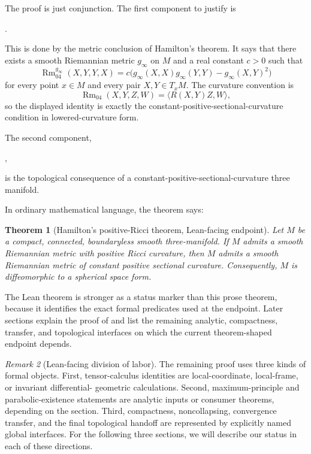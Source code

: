 \documentclass[11pt]{article}
\theoremstyle{plain}
\newtheorem{theorem}{Theorem}[section]
\theoremstyle{definition}
\theoremstyle{remark}
\newtheorem{remark}[theorem]{Remark}
\begin{document}
The proof is just conjunction.  The first component to justify is
\begin{center}
\texttt{}.
\end{center}
This is done by the metric conclusion of Hamilton's theorem.  It says that there exists a
smooth Riemannian metric \(g_\infty\) on \(M\) and a real constant \(c>0\)
such that
\[
  \operatorname{Rm}_{04}^{g_\infty}(X,Y,Y,X)
  =
  c\bigl(
    g_\infty(X,X)g_\infty(Y,Y)
    -
    g_\infty(X,Y)^2
  \bigr)
\]
for every point \(x\in M\) and every pair \(X,Y\in T_xM\).  The curvature
convention is
\[
  \operatorname{Rm}_{04}(X,Y,Z,W)=\langle R(X,Y)Z,W\rangle,
\]
so the displayed identity is exactly the constant-positive-sectional-curvature
condition in lowered-curvature form.

The second component,
\begin{center}
\texttt{},
\end{center}
is the topological consequence of a constant-positive-sectional-curvature three manifold.

In ordinary mathematical language, the theorem says:

\begin{theorem}[Hamilton's positive-Ricci theorem, Lean-facing endpoint]
\label{thm:main-hamilton-3d-lean-facing}
Let \(M\) be a compact, connected, boundaryless smooth three-manifold.  If
\(M\) admits a smooth Riemannian metric with positive Ricci curvature, then
\(M\) admits a smooth Riemannian metric of constant positive sectional
curvature.  Consequently, \(M\) is diffeomorphic to a spherical space form.
\end{theorem}

The Lean theorem is stronger as a status marker than this prose theorem,
because it identifies the exact formal predicates used at the endpoint.  Later
sections explain the proof of \texttt{} and list
the remaining analytic, compactness, transfer, and topological interfaces on
which the current theorem-shaped endpoint depends.


\begin{remark}[Lean-facing division of labor]
\label{rem:lean-division-of-labor}
The remaining proof uses three kinds of formal objects.  First, tensor-calculus
identities are local-coordinate, local-frame, or invariant differential-
geometric calculations.  Second, maximum-principle and parabolic-existence
statements are analytic inputs or consumer theorems, depending on the section.
Third, compactness, noncollapsing, convergence transfer, and the final
topological handoff are represented by explicitly named global interfaces.
For the following three sections, we will describe our status in each of these directions.
\end{remark}
\end{document}
